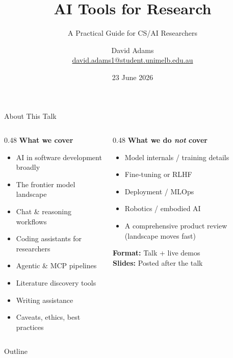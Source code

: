 \documentclass[aspectratio=169, 10pt]{beamer}
\title{AI Tools for Research}
\subtitle{A Practical Guide for CS/AI Researchers}
\author{%
  David Adams\\
  \small\href{mailto:david.adams1@student.unimelb.edu.au}{david.adams1@student.unimelb.edu.au}%
}
\institute{FEIT \\ The University of Melbourne}
\date{23 June 2026}
\begin{document}

\maketitle

\begin{frame}[shrink=5]{About This Talk}
  \begin{columns}[T, onlytextwidth]
    \begin{column}{0.48\textwidth}
      \textbf{What we cover}
      \begin{itemize}\setlength{\itemsep}{1pt}
        \item AI in software development broadly
        \item The frontier model landscape
        \item Chat \& reasoning workflows
        \item Coding assistants for researchers
        \item Agentic \& MCP pipelines
        \item Literature discovery tools
        \item Writing assistance
        \item Caveats, ethics, best practices
      \end{itemize}
    \end{column}
    \hfill
    \begin{column}{0.48\textwidth}
      \textbf{What we do \emph{not} cover}
      \begin{itemize}\setlength{\itemsep}{1pt}
        \item Model internals / training details
        \item Fine-tuning or RLHF
        \item Deployment / MLOps
        \item Robotics / embodied AI
        \item A comprehensive product review (landscape moves fast)
      \end{itemize}
      \vspace{0.4em}
      \textbf{Format:} Talk + live demos\\
      \textbf{Slides:} Posted after the talk
    \end{column}
  \end{columns}
\end{frame}

\begin{frame}{Outline}
  \tableofcontents
\end{frame}
\end{document}
